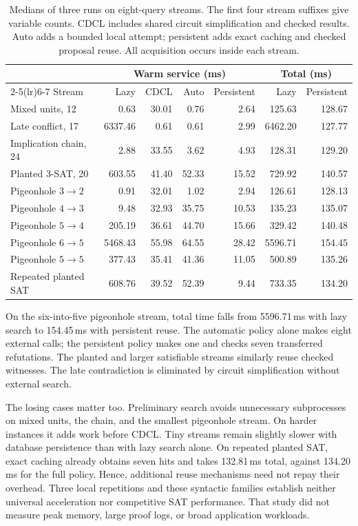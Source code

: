 \documentclass[11pt,a4paper]{article}
\numberwithin{equation}{section}
\theoremstyle{plain}
\theoremstyle{definition}
\theoremstyle{remark}
\begin{document}
\begin{table}[htbp]
\centering
\small
\setlength{\tabcolsep}{4pt}
\begin{tabular}{lrrrrrr}
\toprule
& \multicolumn{4}{c}{Warm service (ms)} & \multicolumn{2}{c}{Total (ms)} \\
\cmidrule(lr){2-5}\cmidrule(lr){6-7}
Stream & Lazy & CDCL & Auto & Persistent & Lazy & Persistent \\
\midrule
Mixed units, 12 & 0.63 & 30.01 & 0.76 & 2.64 & 125.63 & 128.67 \\
Late conflict, 17 & 6337.46 & 0.61 & 0.61 & 2.99 & 6462.20 & 127.77 \\
Implication chain, 24 & 2.88 & 33.55 & 3.62 & 4.93 & 128.31 & 129.20 \\
Planted 3-SAT, 20 & 603.55 & 41.40 & 52.33 & 15.52 & 729.92 & 140.57 \\
Pigeonhole $3\to2$ & 0.91 & 32.01 & 1.02 & 2.94 & 126.61 & 128.13 \\
Pigeonhole $4\to3$ & 9.48 & 32.93 & 35.75 & 10.53 & 135.23 & 135.07 \\
Pigeonhole $5\to4$ & 205.19 & 36.61 & 44.70 & 15.66 & 329.42 & 140.48 \\
Pigeonhole $6\to5$ & 5468.43 & 55.98 & 64.55 & 28.42 & 5596.71 & 154.45 \\
Pigeonhole $5\to5$ & 377.43 & 35.41 & 41.36 & 11.05 & 500.89 & 135.26 \\
Repeated planted SAT & 608.76 & 39.52 & 52.39 & 9.44 & 733.35 & 134.20 \\
\bottomrule
\end{tabular}
\caption{Medians of three runs on eight-query streams. The first four stream suffixes give variable counts. CDCL includes shared circuit simplification and checked results. Auto adds a bounded local attempt; persistent adds exact caching and checked proposal reuse. All acquisition occurs inside each stream.}
\label{tab:cdcl-results}
\end{table}

On the six-into-five pigeonhole stream, total time falls from 5596.71\,ms with lazy search to 154.45\,ms with persistent reuse. The automatic policy alone makes eight external calls; the persistent policy makes one and checks seven transferred refutations. The planted and larger satisfiable streams similarly reuse checked witnesses. The late contradiction is eliminated by circuit simplification without external search.

The losing cases matter too. Preliminary search avoids unnecessary subprocesses on mixed units, the chain, and the smallest pigeonhole stream. On harder instances it adds work before CDCL. Tiny streams remain slightly slower with database persistence than with lazy search alone. On repeated planted SAT, exact caching already obtains seven hits and takes 132.81\,ms total, against 134.20\,ms for the full policy. Hence, additional reuse mechanisms need not repay their overhead. Three local repetitions and these syntactic families establish neither universal acceleration nor competitive SAT performance. That study did not measure peak memory, large proof logs, or broad application workloads.
\end{document}
